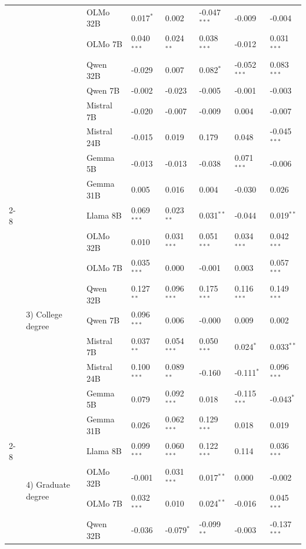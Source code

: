 \begin{longtable}[t]{llllllll}
 &  & OLMo 32B & 0.017$^{*}$ & 0.002 & -0.047$^{***}$ & -0.009 & -0.004 \\
 &  & OLMo 7B & 0.040$^{***}$ & 0.024$^{**}$ & 0.038$^{***}$ & -0.012 & 0.031$^{***}$ \\
 &  & Qwen 32B & -0.029 & 0.007 & 0.082$^{*}$ & -0.052$^{***}$ & 0.083$^{***}$ \\
 &  & Qwen 7B & -0.002 & -0.023 & -0.005 & -0.001 & -0.003 \\
 &  & Mistral 7B & -0.020 & -0.007 & -0.009 & 0.004 & -0.007 \\
 &  & Mistral 24B & -0.015 & 0.019 & 0.179 & 0.048 & -0.045$^{***}$ \\
 &  & Gemma 5B & -0.013 & -0.013 & -0.038 & 0.071$^{***}$ & -0.006 \\
 &  & Gemma 31B & 0.005 & 0.016 & 0.004 & -0.030 & 0.026 \\
\cline{2-8}
 & \multirow[t]{9}{*}{3) College degree} & Llama 8B & 0.069$^{***}$ & 0.023$^{**}$ & 0.031$^{**}$ & -0.044 & 0.019$^{**}$ \\
 &  & OLMo 32B & 0.010 & 0.031$^{***}$ & 0.051$^{***}$ & 0.034$^{***}$ & 0.042$^{***}$ \\
 &  & OLMo 7B & 0.035$^{***}$ & 0.000 & -0.001 & 0.003 & 0.057$^{***}$ \\
 &  & Qwen 32B & 0.127$^{**}$ & 0.096$^{***}$ & 0.175$^{***}$ & 0.116$^{***}$ & 0.149$^{***}$ \\
 &  & Qwen 7B & 0.096$^{***}$ & 0.006 & -0.000 & 0.009 & 0.002 \\
 &  & Mistral 7B & 0.037$^{**}$ & 0.054$^{***}$ & 0.050$^{***}$ & 0.024$^{*}$ & 0.033$^{**}$ \\
 &  & Mistral 24B & 0.100$^{***}$ & 0.089$^{**}$ & -0.160 & -0.111$^{*}$ & 0.096$^{***}$ \\
 &  & Gemma 5B & 0.079 & 0.092$^{***}$ & 0.018 & -0.115$^{***}$ & -0.043$^{*}$ \\
 &  & Gemma 31B & 0.026 & 0.062$^{***}$ & 0.129$^{***}$ & 0.018 & 0.019 \\
\cline{2-8}
 & \multirow[t]{9}{*}{4) Graduate degree} & Llama 8B & 0.099$^{***}$ & 0.060$^{***}$ & 0.122$^{***}$ & 0.114 & 0.036$^{***}$ \\
 &  & OLMo 32B & -0.001 & 0.031$^{***}$ & 0.017$^{**}$ & 0.000 & -0.002 \\
 &  & OLMo 7B & 0.032$^{***}$ & 0.010 & 0.024$^{**}$ & -0.016 & 0.045$^{***}$ \\
 &  & Qwen 32B & -0.036 & -0.079$^{*}$ & -0.099$^{**}$ & -0.003 & -0.137$^{***}$ \\

\end{longtable}
